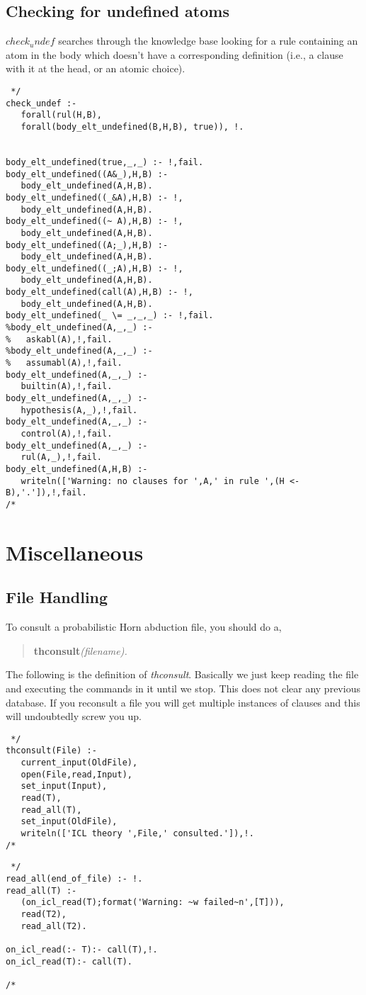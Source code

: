 \documentclass[11pt,fleqn]{article}
\begin{document}
\subsection{Checking for undefined atoms}
$check_undef$ searches through the knowledge base looking for a rule
containing an atom in the body which doesn't have a corresponding
definition (i.e., a clause with it at the head, or an atomic choice).
\begin{verbatim} */
check_undef :-
   forall(rul(H,B),
   forall(body_elt_undefined(B,H,B), true)), !.


body_elt_undefined(true,_,_) :- !,fail.
body_elt_undefined((A&_),H,B) :-
   body_elt_undefined(A,H,B).
body_elt_undefined((_&A),H,B) :- !,
   body_elt_undefined(A,H,B).
body_elt_undefined((~ A),H,B) :- !,
   body_elt_undefined(A,H,B).
body_elt_undefined((A;_),H,B) :-
   body_elt_undefined(A,H,B).
body_elt_undefined((_;A),H,B) :- !,
   body_elt_undefined(A,H,B).
body_elt_undefined(call(A),H,B) :- !,
   body_elt_undefined(A,H,B).
body_elt_undefined(_ \= _,_,_) :- !,fail.
%body_elt_undefined(A,_,_) :-
%   askabl(A),!,fail.
%body_elt_undefined(A,_,_) :-
%   assumabl(A),!,fail.
body_elt_undefined(A,_,_) :-
   builtin(A),!,fail.
body_elt_undefined(A,_,_) :-
   hypothesis(A,_),!,fail.
body_elt_undefined(A,_,_) :-
   control(A),!,fail.
body_elt_undefined(A,_,_) :-
   rul(A,_),!,fail.
body_elt_undefined(A,H,B) :-
   writeln(['Warning: no clauses for ',A,' in rule ',(H <- B),'.']),!,fail.
/* \end{verbatim}

\section{Miscellaneous}
\subsection{File Handling}
To consult a probabilistic Horn abduction file, you should do a,
\begin{verse}
{\bf thconsult}\em (filename).
\end{verse}
The following is the definition of {\em thconsult}. Basically we just
keep reading the file and executing the commands in it until we stop.
This does not clear any previous database. If you reconsult a file you
will get multiple instances of clauses and this will undoubtedly screw you up.
\begin{verbatim} */
thconsult(File) :-
   current_input(OldFile),
   open(File,read,Input),
   set_input(Input),
   read(T),
   read_all(T),
   set_input(OldFile),
   writeln(['ICL theory ',File,' consulted.']),!.
/* \end{verbatim}
\begin{verbatim} */
read_all(end_of_file) :- !.
read_all(T) :-
   (on_icl_read(T);format('Warning: ~w failed~n',[T])),
   read(T2),
   read_all(T2).

on_icl_read(:- T):- call(T),!.
on_icl_read(T):- call(T).

/* \end{verbatim}
\end{document}
